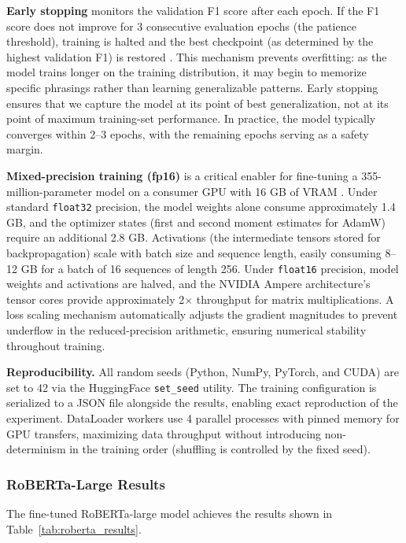 \documentclass[12pt, letterpaper]{article}   %
\begin{document}
\textbf{Early stopping} monitors the validation F1 score after each epoch. If the F1 score does not improve for 3 consecutive evaluation epochs (the patience threshold), training is halted and the best checkpoint (as determined by the highest validation F1) is restored \cite{ref27}. This mechanism prevents overfitting: as the model trains longer on the training distribution, it may begin to memorize specific phrasings rather than learning generalizable patterns. Early stopping ensures that we capture the model at its point of best generalization, not at its point of maximum training-set performance. In practice, the model typically converges within 2--3 epochs, with the remaining epochs serving as a safety margin.

\textbf{Mixed-precision training (fp16)} is a critical enabler for fine-tuning a 355-million-parameter model on a consumer GPU with 16 GB of VRAM \cite{ref13}\cite{ref38}. Under standard \texttt{float32} precision, the model weights alone consume approximately 1.4 GB, and the optimizer states (first and second moment estimates for AdamW) require an additional 2.8 GB. Activations (the intermediate tensors stored for backpropagation) scale with batch size and sequence length, easily consuming 8--12 GB for a batch of 16 sequences of length 256. Under \texttt{float16} precision, model weights and activations are halved, and the NVIDIA Ampere architecture's tensor cores provide approximately 2$\times$ throughput for matrix multiplications. A loss scaling mechanism automatically adjusts the gradient magnitudes to prevent underflow in the reduced-precision arithmetic, ensuring numerical stability throughout training.

\textbf{Reproducibility.} All random seeds (Python, NumPy, PyTorch, and CUDA) are set to 42 via the HuggingFace \texttt{set\_seed} utility. The training configuration is serialized to a JSON file alongside the results, enabling exact reproduction of the experiment. DataLoader workers use 4 parallel processes with pinned memory for GPU transfers, maximizing data throughput without introducing non-determinism in the training order (shuffling is controlled by the fixed seed).

\subsubsection{RoBERTa-Large Results}

The fine-tuned RoBERTa-large model achieves the results shown in Table~\ref{tab:roberta_results}.
\end{document}
